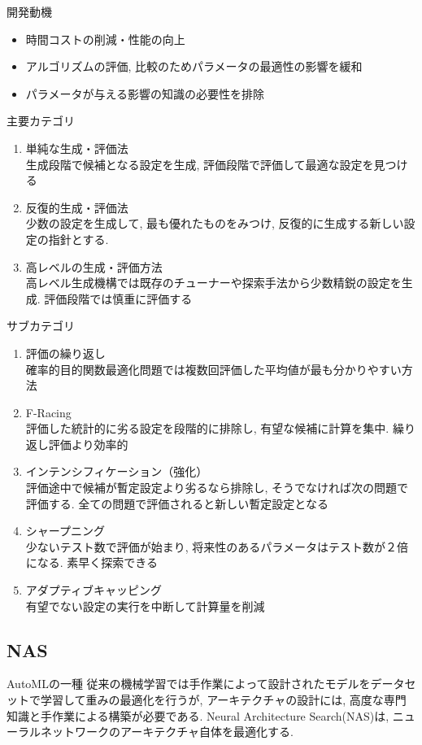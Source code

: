 \documentclass[twocolumn]{jarticle}     %
\begin{document}
開発動機
\begin{itemize}
  \item 時間コストの削減・性能の向上
  \item アルゴリズムの評価, 比較のためパラメータの最適性の影響を緩和
  \item パラメータが与える影響の知識の必要性を排除
\end{itemize}
主要カテゴリ
\begin{enumerate}
  \item 単純な生成・評価法 \\
  生成段階で候補となる設定を生成, 評価段階で評価して最適な設定を見つける

  \item 反復的生成・評価法 \\
  少数の設定を生成して, 最も優れたものをみつけ, 反復的に生成する新しい設定の指針とする.

  \item 高レベルの生成・評価方法 \\
  高レベル生成機構では既存のチューナーや探索手法から少数精鋭の設定を生成.
  評価段階では慎重に評価する
\end{enumerate}

サブカテゴリ
\begin{enumerate}
  \item 評価の繰り返し \\
  確率的目的関数最適化問題では複数回評価した平均値が最も分かりやすい方法

  \item F-Racing \\
  評価した統計的に劣る設定を段階的に排除し, 有望な候補に計算を集中. 繰り返し評価より効率的

  \item インテンシフィケーション（強化） \\
  評価途中で候補が暫定設定より劣るなら排除し, そうでなければ次の問題で評価する. 全ての問題で評価されると新しい暫定設定となる

  \item シャープニング \\
  少ないテスト数で評価が始まり, 将来性のあるパラメータはテスト数が２倍になる. 素早く探索できる

  \item アダプティブキャッピング  \\
  有望でない設定の実行を中断して計算量を削減
\end{enumerate}

\subsection{NAS}
AutoMLの一種
従来の機械学習では手作業によって設計されたモデルをデータセットで学習して重みの最適化を行うが, アーキテクチャの設計には, 高度な専門知識と手作業による構築が必要である.
Neural Architecture Search(NAS)\cite{DBLP:journals/corr/ZophL16}は, ニューラルネットワークのアーキテクチャ自体を最適化する.
\end{document}
